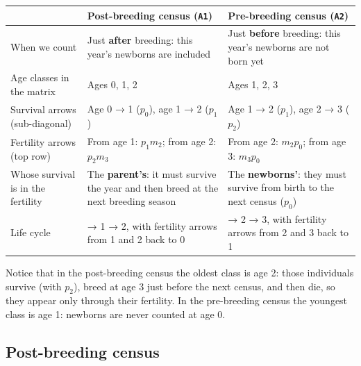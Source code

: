 \documentclass[
  a4paper]{book}
\newcounter{none} %
\begin{document}
{\def\LTcaptype{none} %
\begin{longtable}[]{@{}
  >{\raggedright\arraybackslash}p{}
  >{\raggedright\arraybackslash}p{}
  >{\raggedright\arraybackslash}p{}@{}}
\toprule\noalign{}
\begin{minipage}[b]{\linewidth}\raggedright
\end{minipage} & \begin{minipage}[b]{\linewidth}\raggedright
Post-breeding census (\texttt{A1})
\end{minipage} & \begin{minipage}[b]{\linewidth}\raggedright
Pre-breeding census (\texttt{A2})
\end{minipage} \\
\midrule\noalign{}
\endhead
\bottomrule\noalign{}
\endlastfoot
When we count & Just \textbf{after} breeding: this year's newborns are included & Just \textbf{before} breeding: this year's newborns are not born yet \\
Age classes in the matrix & Ages 0, 1, 2 & Ages 1, 2, 3 \\
Survival arrows (sub-diagonal) & Age 0 → 1 (\(p_0\)), age 1 → 2 (\(p_1\)) & Age 1 → 2 (\(p_1\)), age 2 → 3 (\(p_2\)) \\
Fertility arrows (top row) & From age 1: \(p_1 m_2\); from age 2: \(p_2 m_3\) & From age 2: \(m_2 p_0\); from age 3: \(m_3 p_0\) \\
Whose survival is in the fertility & The \textbf{parent's}: it must survive the year and then breed at the next breeding season & The \textbf{newborns'}: they must survive from birth to the next census (\(p_0\)) \\
Life cycle & 0 → 1 → 2, with fertility arrows from 1 and 2 back to 0 & 1 → 2 → 3, with fertility arrows from 2 and 3 back to 1 \\
\end{longtable}
}

Notice that in the post-breeding census the oldest class is age 2: those individuals survive (with \(p_2\)), breed at age 3 just before the next census, and then die, so they appear only through their fertility. In the pre-breeding census the youngest class is age 1: newborns are never counted at age 0.

\subsection{Post-breeding census}\label{post-breeding-census}
\end{document}
